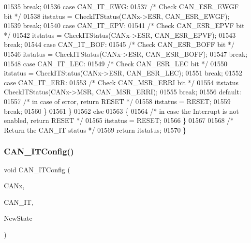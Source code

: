 \begin{DoxyCode}
01535         \textcolor{keywordflow}{break};
01536       \textcolor{keywordflow}{case} CAN_IT_EWG:
01537         \textcolor{comment}{/* Check CAN\_ESR\_EWGF bit */}
01538         itstatus = CheckITStatus(CANx->ESR, CAN_ESR_EWGF);  
01539         \textcolor{keywordflow}{break};
01540       \textcolor{keywordflow}{case} CAN_IT_EPV:
01541         \textcolor{comment}{/* Check CAN\_ESR\_EPVF bit */}
01542         itstatus = CheckITStatus(CANx->ESR, CAN_ESR_EPVF);  
01543         \textcolor{keywordflow}{break};
01544       \textcolor{keywordflow}{case} CAN_IT_BOF:
01545         \textcolor{comment}{/* Check CAN\_ESR\_BOFF bit */}
01546         itstatus = CheckITStatus(CANx->ESR, CAN_ESR_BOFF);  
01547         \textcolor{keywordflow}{break};
01548       \textcolor{keywordflow}{case} CAN_IT_LEC:
01549         \textcolor{comment}{/* Check CAN\_ESR\_LEC bit */}
01550         itstatus = CheckITStatus(CANx->ESR, CAN_ESR_LEC);  
01551         \textcolor{keywordflow}{break};
01552       \textcolor{keywordflow}{case} CAN_IT_ERR:
01553         \textcolor{comment}{/* Check CAN\_MSR\_ERRI bit */} 
01554         itstatus = CheckITStatus(CANx->MSR, CAN_MSR_ERRI); 
01555         \textcolor{keywordflow}{break};
01556       \textcolor{keywordflow}{default}:
01557         \textcolor{comment}{/* in case of error, return RESET */}
01558         itstatus = RESET;
01559         \textcolor{keywordflow}{break};
01560     \}
01561   \}
01562   \textcolor{keywordflow}{else}
01563   \{
01564    \textcolor{comment}{/* in case the Interrupt is not enabled, return RESET */}
01565     itstatus  = RESET;
01566   \}
01567   
01568   \textcolor{comment}{/* Return the CAN\_IT status */}
01569   \textcolor{keywordflow}{return}  itstatus;
01570 \}
\end{DoxyCode}
\mbox{\label{group__CAN__Group6_gad1a8b2499a780b5bfa4accb3597b02f4}} 
\subsubsection{C\+A\+N\+\_\+\+I\+T\+Config()}
{\footnotesize\ttfamily void C\+A\+N\+\_\+\+I\+T\+Config (\begin{DoxyParamCaption}\item[{\textbf{ C\+A\+N\+\_\+\+Type\+Def} $\ast$}]{C\+A\+Nx,  }\item[{uint32\+\_\+t}]{C\+A\+N\+\_\+\+IT,  }\item[{\textbf{ Functional\+State}}]{New\+State }\end{DoxyParamCaption})}



